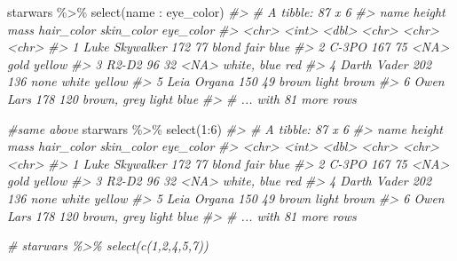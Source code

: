 \documentclass[
]{book}
\newenvironment{Shaded}{\begin{snugshade}}{\end{snugshade}}
\newcommand{\CommentTok}[1]{\textcolor[rgb]{0.56,0.35,0.01}{\textit{#1}}}
\newcommand{\DecValTok}[1]{\textcolor[rgb]{0.00,0.00,0.81}{#1}}
\newcommand{\FunctionTok}[1]{\textcolor[rgb]{0.00,0.00,0.00}{#1}}
\newcommand{\NormalTok}[1]{#1}
\newcommand{\SpecialCharTok}[1]{\textcolor[rgb]{0.00,0.00,0.00}{#1}}
\begin{document}
\begin{Shaded}
\begin{Highlighting}[]
\NormalTok{starwars }\SpecialCharTok{\%\textgreater{}\%} 
  \FunctionTok{select}\NormalTok{(name }\SpecialCharTok{:}\NormalTok{ eye\_color)}
\CommentTok{\#\textgreater{} \# A tibble: 87 x 6}
\CommentTok{\#\textgreater{}   name           height  mass hair\_color  skin\_color  eye\_color}
\CommentTok{\#\textgreater{}   \textless{}chr\textgreater{}           \textless{}int\textgreater{} \textless{}dbl\textgreater{} \textless{}chr\textgreater{}       \textless{}chr\textgreater{}       \textless{}chr\textgreater{}    }
\CommentTok{\#\textgreater{} 1 Luke Skywalker    172    77 blond       fair        blue     }
\CommentTok{\#\textgreater{} 2 C{-}3PO             167    75 \textless{}NA\textgreater{}        gold        yellow   }
\CommentTok{\#\textgreater{} 3 R2{-}D2              96    32 \textless{}NA\textgreater{}        white, blue red      }
\CommentTok{\#\textgreater{} 4 Darth Vader       202   136 none        white       yellow   }
\CommentTok{\#\textgreater{} 5 Leia Organa       150    49 brown       light       brown    }
\CommentTok{\#\textgreater{} 6 Owen Lars         178   120 brown, grey light       blue     }
\CommentTok{\#\textgreater{} \# ... with 81 more rows}

\CommentTok{\#same above}
\NormalTok{starwars }\SpecialCharTok{\%\textgreater{}\%} 
  \FunctionTok{select}\NormalTok{(}\DecValTok{1}\SpecialCharTok{:}\DecValTok{6}\NormalTok{)}
\CommentTok{\#\textgreater{} \# A tibble: 87 x 6}
\CommentTok{\#\textgreater{}   name           height  mass hair\_color  skin\_color  eye\_color}
\CommentTok{\#\textgreater{}   \textless{}chr\textgreater{}           \textless{}int\textgreater{} \textless{}dbl\textgreater{} \textless{}chr\textgreater{}       \textless{}chr\textgreater{}       \textless{}chr\textgreater{}    }
\CommentTok{\#\textgreater{} 1 Luke Skywalker    172    77 blond       fair        blue     }
\CommentTok{\#\textgreater{} 2 C{-}3PO             167    75 \textless{}NA\textgreater{}        gold        yellow   }
\CommentTok{\#\textgreater{} 3 R2{-}D2              96    32 \textless{}NA\textgreater{}        white, blue red      }
\CommentTok{\#\textgreater{} 4 Darth Vader       202   136 none        white       yellow   }
\CommentTok{\#\textgreater{} 5 Leia Organa       150    49 brown       light       brown    }
\CommentTok{\#\textgreater{} 6 Owen Lars         178   120 brown, grey light       blue     }
\CommentTok{\#\textgreater{} \# ... with 81 more rows}

\CommentTok{\# starwars \%\textgreater{}\% select(c(1,2,4,5,7))}
\end{Highlighting}
\end{Shaded}
\end{document}
